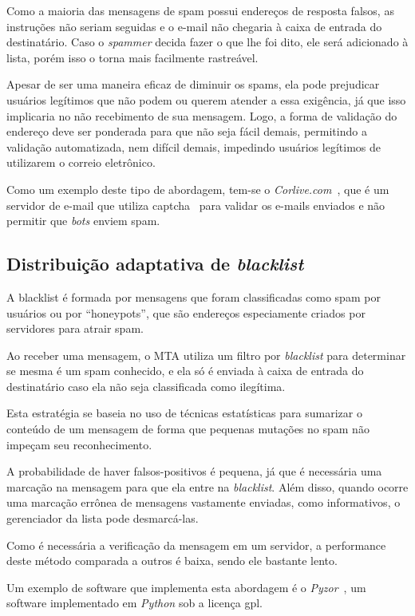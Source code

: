 \documentclass[a4paper,dvipdfm]{article}
\begin{document}
		Como a maioria das mensagens de spam possui endereços de resposta falsos, as instruções não seriam seguidas e o e-mail não chegaria à caixa de entrada do destinatário.
		Caso o \emph{spammer} decida fazer o que lhe foi dito, ele será adicionado à lista, porém isso o torna mais facilmente rastreável.
		
		Apesar de ser uma maneira eficaz de diminuir os spams, ela pode prejudicar usuários legítimos que não podem ou querem atender a essa exigência, já que isso implicaria no não recebimento de sua mensagem.
		Logo, a forma de validação do endereço deve ser ponderada para que não seja fácil demais, permitindo a validação automatizada, nem difícil demais, impedindo usuários legítimos de utilizarem o correio eletrônico.
		
		Como um exemplo deste tipo de abordagem, tem-se o \emph{Corlive.com}~\cite{corlive}, que é um servidor de e-mail que utiliza \gls{captcha}~\cite{captcha} para validar os e-mails enviados e não permitir que \emph{bots} enviem spam.

	\subsection{Distribuição adaptativa de \emph{blacklist}}
		A \gls{blacklist} é formada por mensagens que foram classificadas como spam por usuários ou por ``honeypots'', que são endereços especiamente criados por servidores para atrair spam.

		Ao receber uma mensagem, o MTA utiliza um filtro por \emph{blacklist} para determinar se mesma é um spam conhecido, e ela só é enviada à caixa de entrada do destinatário caso ela não seja classificada como ilegítima.

		Esta estratégia se baseia no uso de técnicas estatísticas para sumarizar o conteúdo de um mensagem de forma que pequenas mutações no spam não impeçam seu reconhecimento.

		A probabilidade de haver falsos-positivos é pequena, já que é necessária uma marcação na mensagem para que ela entre na \emph{blacklist}. Além disso, quando ocorre uma marcação errônea de mensagens vastamente enviadas, como informativos, o gerenciador da lista pode desmarcá-las.
		
		Como é necessária a verificação da mensagem em um servidor, a performance deste método comparada a outros é baixa, sendo ele bastante lento.

		Um exemplo de software que implementa esta abordagem é o \emph{Pyzor}~\cite{pyzor}, um software implementado em \emph{Python} sob a licença \gls{gpl}.
\end{document}
